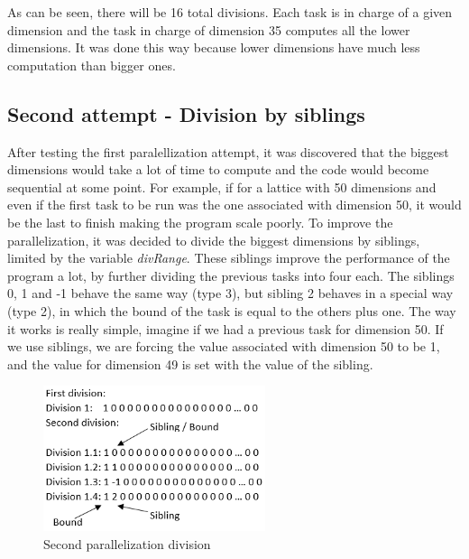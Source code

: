 \documentclass[conference]{IEEEtran}
\begin{document}
As can be seen, there will be 16 total divisions. Each task is in charge of a given dimension and the task in charge of dimension 35 computes all the lower dimensions. It was done this way because lower dimensions have much less computation than bigger ones. 

\subsection{Second attempt - Division by siblings}
After testing the first paralellization attempt, it was discovered that the biggest dimensions would take a lot of time to compute and the code would become sequential at some point. For example, if for a lattice with 50 dimensions and even if the first task to be run was the one associated with dimension 50, it would be the last to finish making the program scale poorly.
To improve the parallelization, it was decided to divide the biggest dimensions by siblings, limited by the variable \emph{divRange}. These siblings improve the performance of the program a lot, by further dividing the previous tasks into four each. The siblings  0, 1 and -1 behave the same way (type 3), but sibling 2 behaves in a special way (type 2), in  which the bound of the task is equal to the others plus one. The way it works is really simple, imagine if we had a previous task for dimension 50. If we use siblings, we are forcing the value associated with dimension 50 to be 1, and the value for dimension 49 is set with the value of the sibling. 

\begin{figure}[ht!]
\centering
\includegraphics[width=65mm]{imgParallel/SegundaParalelizacao}
\caption{Second parallelization division}
\end{figure}
\end{document}

